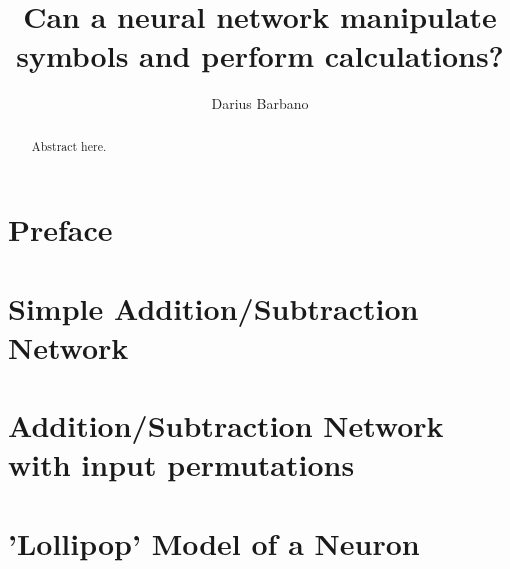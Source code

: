 \documentclass[12pt]{article}
\begin{document}
\title{Can a neural network manipulate symbols and perform calculations? }
\author{Darius Barbano}
\date{}
\maketitle
\begin{abstract}
   Abstract here.
\end{abstract}
\newpage
\section{Preface}


\newpage
\section{Simple Addition/Subtraction Network}


\newpage
\section{Addition/Subtraction Network with input permutations}


\newpage
\section{'Lollipop' Model of a Neuron}

\end{document}
